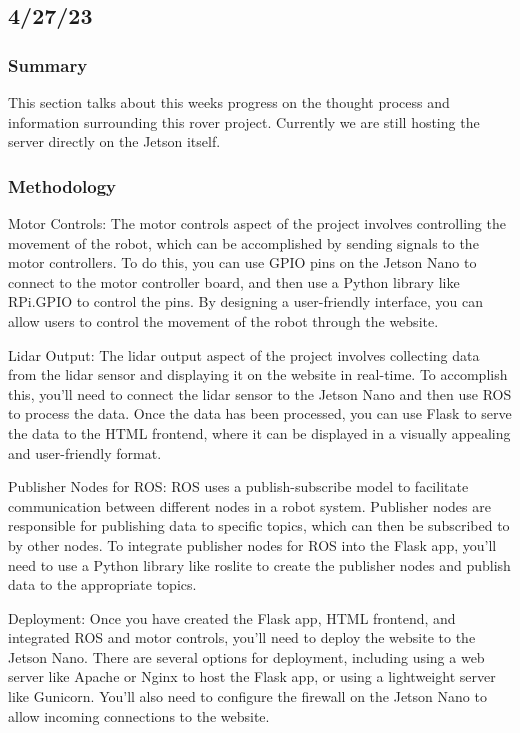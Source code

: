 \documentclass[a4paper, 10pt]{article}
\begin{document}
    \subsection{4/27/23}
        \subsubsection{Summary}
        This section talks about this weeks progress on the thought process and information surrounding this rover project.
        Currently we are still hosting the server directly on the Jetson itself.
        
        \subsubsection{Methodology}
        Motor Controls: The motor controls aspect of the project involves controlling the movement of the robot, which can be accomplished by sending signals to the motor controllers. To do this, you can use GPIO pins on the Jetson Nano to connect to the motor controller board, and then use a Python library like RPi.GPIO to control the pins. By designing a user-friendly interface, you can allow users to control the movement of the robot through the website.
        
        Lidar Output: The lidar output aspect of the project involves collecting data from the lidar sensor and displaying it on the website in real-time. To accomplish this, you'll need to connect the lidar sensor to the Jetson Nano and then use ROS to process the data. Once the data has been processed, you can use Flask to serve the data to the HTML frontend, where it can be displayed in a visually appealing and user-friendly format.
        
        Publisher Nodes for ROS: ROS uses a publish-subscribe model to facilitate communication between different nodes in a robot system. Publisher nodes are responsible for publishing data to specific topics, which can then be subscribed to by other nodes. To integrate publisher nodes for ROS into the Flask app, you'll need to use a Python library like roslite to create the publisher nodes and publish data to the appropriate topics.
        
        Deployment: Once you have created the Flask app, HTML frontend, and integrated ROS and motor controls, you'll need to deploy the website to the Jetson Nano. There are several options for deployment, including using a web server like Apache or Nginx to host the Flask app, or using a lightweight server like Gunicorn. You'll also need to configure the firewall on the Jetson Nano to allow incoming connections to the website.
\end{document}
